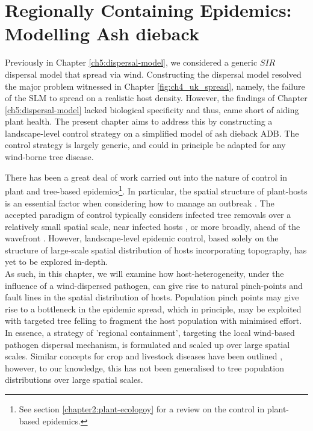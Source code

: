 \chapter{Regionally Containing Epidemics: Modelling Ash dieback}


Previously in Chapter \ref{ch5:dispersal-model}, we considered a generic $SIR$ dispersal model that spread via wind. Constructing the dispersal model resolved the major problem witnessed in Chapter \ref{fig:ch4_uk_spread}, namely, the failure of the SLM to spread on a realistic host density. However, the findings of Chapter \ref{ch5:dispersal-model} lacked biological specificity and thus, came short of aiding plant health. The present chapter aims to address this by constructing a landscape-level control strategy on a simplified model of ash dieback ADB. The control strategy is largely generic, and could in principle be adapted for any wind-borne tree disease.

There has been a great deal of work carried out into the nature of control in plant and tree-based epidemics\footnote{See section \ref{chapter2:plant-ecologoy} for a review on the control in plant-based epidemics.}. In particular, the spatial structure of plant-hosts is an essential factor when considering how to manage an outbreak \cite{spatial-control-optimisation, control-heterogeneous-landscapes}. The accepted paradigm of control typically considers infected tree removals over a relatively small spatial scale, near infected hosts \cite{WEBIDEMICS}, or more broadly, ahead of the wavefront \cite{large-scale-control}. However, landscape-level epidemic control, based solely on the structure of large-scale spatial distribution of hosts incorporating topography, has yet to be explored in-depth.\\

As such, in this chapter, we will examine how host-heterogeneity, under the influence of a wind-dispersed pathogen, can give rise to natural pinch-points and fault lines in the spatial distribution of hosts. Population pinch points may give rise to a bottleneck in the epidemic spread, which in principle, may be exploited with targeted tree felling to fragment the host population with minimised effort. In essence, a strategy of 'regional containment', targeting the local wind-based pathogen dispersal mechanism, is formulated and scaled up over large spatial scales. Similar concepts for crop and livestock diseases have been outlined \cite{PAPAIX201435, GILIOLI20131, Gilligan-disease-management}, however, to our knowledge, this has not been generalised to tree population distributions over large spatial scales.

